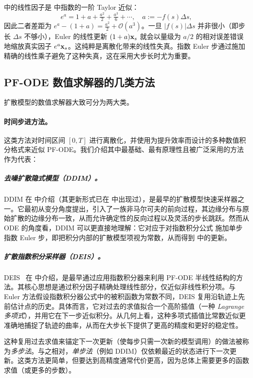  中的线性因子是  中指数的一阶 Taylor 近似：
\[
e^{a}=1+a+\tfrac{a^2}{2}+\tfrac{a^3}{6}+\cdots,\quad a:=-f(s)\Delta s,
\]
因此二者差距为 $e^{a}-(1+a)=\tfrac{a^2}{2}+\mathcal O(a^3)$。一旦 $|f(s)|\Delta s$ 并非很小（即步长 $\Delta s$ 不够小），Euler 的线性更新 $(1+a){\mathbf{x}}_s$ 就会以量级为 $a/2$ 的相对误差错误地缩放真实因子 $e^{a}{\mathbf{x}}_s$。这纯粹是离散化带来的线性失真。指数 Euler 步通过施加精确的线性乘子避免了这种失真，这在采用大步长时尤为重要。






\subsection{PF-ODE 数值求解器的几类方法}
扩散模型的数值求解器大致可分为两大类。

\paragraph{时间步进方法。}
这类方法对时间区间 $[0,T]$ 进行离散化，并使用为提升效率而设计的多种数值积分格式来近似 PF-ODE。我们介绍其中最基础、最有原理性且被广泛采用的方法作为代表：

\subparagraph{去噪扩散隐式模型（DDIM）。} DDIM 在  中介绍（其更新形式已在  中出现过），是最早的扩散模型快速采样器之一。它最初从变分角度提出，引入了一族非马尔可夫的前向过程，其边缘分布与原始扩散的边缘分布一致，从而允许确定性的反向过程以及灵活的步长跳跃。然而从 ODE 的角度看，DDIM 可以更直接地理解：它对应于对指数积分公式  施加单步指数 Euler 步，即把积分内部的扩散模型项视为常数，从而得到  中的更新。

\subparagraph{扩散指数积分采样器（DEIS）。}
DEIS~\citep{zhang2022fast} 在  中介绍，是最早通过应用指数积分器来利用 PF-ODE 半线性结构的方法。其核心思想是通过积分因子精确处理线性部分，仅近似非线性积分项。与 Euler 方法假设指数积分器公式中的被积函数为常数不同，DEIS 复用沿轨迹上先前估计点的历史。具体而言，它对过去的求值拟合一个高阶插值（一种 \emph{Lagrange 多项式}），并用它在下一步近似积分。从几何上看，这种多项式插值比常数近似更准确地捕捉了轨迹的曲率，从而在大步长下提供了更高的精度和更好的稳定性。

这种复用过去求值来锚定下一次更新（使每步只需一次新的模型调用）的做法被称为\emph{多步法}。与之相对，\emph{单步法}（例如 DDIM）仅依赖最近的状态进行下一次更新。这类方法更简单，但要达到高精度通常代价更高，因为总体上需要更多的函数求值（或更多的步数）。

